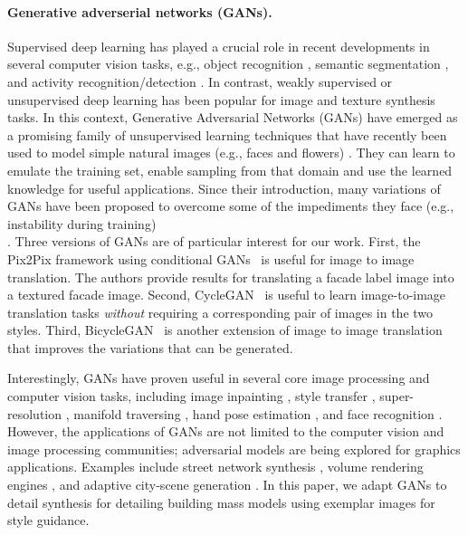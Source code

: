 \paragraph*{Generative adverserial networks (GANs).}
Supervised deep learning has played a crucial role in recent developments in several computer vision tasks, e.g., object recognition \cite{he2016deep,krizhevsky2012imagenet}, semantic segmentation \cite{long2015fully}, and activity recognition/detection \cite{escorcia2016daps, tran2015learning}. 
In contrast, weakly supervised or unsupervised deep learning has been popular for image and texture synthesis tasks. 
In this context, Generative Adversarial Networks (GANs) have emerged as a promising family of unsupervised learning techniques that have recently been used to model simple natural images (e.g., faces and flowers) \cite{GAN}. They can learn to emulate the training set,  enable sampling from that domain and use the  learned knowledge for useful applications. Since their introduction, many variations of GANs have been proposed to overcome some of the impediments they face (e.g., instability during training)\\ \cite{WGAN,BEGAN,LaplacianPyrmid,Bigan,inception-GANs2,catGAN,improvGANfeature,zhao2016energy}. Three versions of GANs are of particular interest for our work. First, the Pix2Pix framework using conditional GANs~\cite{pix2pix} is useful for image to image translation. The authors provide results for translating a facade label image into a textured facade image. Second, CycleGAN~\cite{cycleGAN} is useful to learn image-to-image translation tasks \textit{without} requiring a corresponding pair of images in the two styles. Third, BicycleGAN~\cite{zhu2017multimodal} is another extension of image to image translation that improves the variations that can be generated.

Interestingly, GANs have proven useful in several core image processing and computer vision tasks, including image inpainting \cite{inpainting}, style transfer \cite{style-transfer}, super-resolution \cite{pix2pix,superresolution}, manifold traversing \cite{manifold-manipulation}, hand pose estimation \cite{hand-pose}, and face recognition \cite{face-recog}. However, the applications of GANs are not limited to the computer vision and image processing communities; adversarial models are being explored for graphics applications. Examples include street network synthesis \cite{StreetGAN}, volume rendering engines \cite{Berger:TVCG:2018}, and  adaptive city-scene generation \cite{sceneGAN}. In this paper, we adapt GANs to detail synthesis for detailing building mass models using exemplar images for style guidance.

